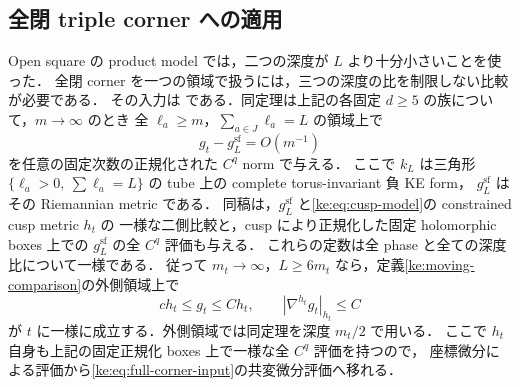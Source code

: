 \subsection{全閉 triple corner への適用}

Open square の product model では，二つの深度が $L$ より十分小さいことを使った．
全閉 corner を一つの領域で扱うには，三つの深度の比を制限しない比較が必要である．
その入力は \cite[Part~IV, \texttt{coarse:thm:full-triple-tensor}]{KELocalCurrent}
である．同定理は上記の各固定 $d\ge5$ の族について，$m\to\infty$ のとき
全 $\ell_a\ge m$，$\sum_{a\in J}\ell_a=L$ の領域上で
\[
 g_t-g_L^{\mathrm{sf}}=O(m^{-1})
\]
を任意の固定次数の正規化された $C^q$ norm で与える．
ここで $k_L$ は三角形
$\{\ell_a>0,\ \sum\ell_a=L\}$ の tube 上の complete torus-invariant 負 KE form，
$g_L^{\mathrm{sf}}$ はその Riemannian metric である．
同稿は，$g_L^{\mathrm{sf}}$ と\eqref{ke:eq:cusp-model}の constrained cusp metric $h_t$ の
一様な二側比較と，cusp により正規化した固定 holomorphic boxes 上での
$g_L^{\mathrm{sf}}$ の全 $C^q$ 評価も与える．
これらの定数は全 phase と全ての深度比について一様である．
従って $m_t\to\infty$，$L\ge6m_t$ なら，定義\ref{ke:moving-comparison}の外側領域上で
\begin{equation}\label{ke:eq:full-corner-input}
 c h_t\le g_t\le C h_t,
 \qquad |\nabla^{h_t}g_t|_{h_t}\le C
\end{equation}
が $t$ に一様に成立する．外側領域では同定理を深度 $m_t/2$ で用いる．
ここで $h_t$ 自身も上記の固定正規化 boxes 上で一様な全 $C^q$ 評価を持つので，
座標微分による評価から\eqref{ke:eq:full-corner-input}の共変微分評価へ移れる．

